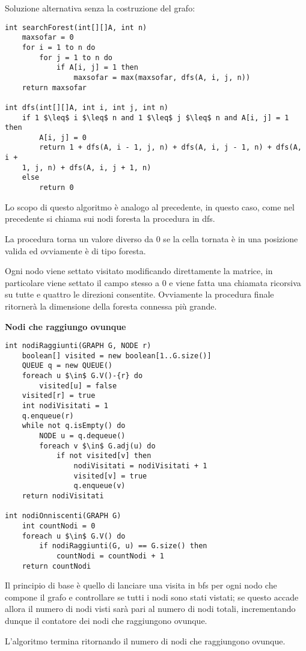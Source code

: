 \documentclass[../cheatSheetAlgoritmi.tex]{subfiles}
\begin{document}
\bigskip

Soluzione alternativa senza la costruzione del grafo:
\begin{lstlisting}[caption=Foresta senza costruzione del grafo]
int searchForest(int[][]A, int n)
	maxsofar = 0
  	for i = 1 to n do
    	for j = 1 to n do
      		if A[i, j] = 1 then
        		maxsofar = max(maxsofar, dfs(A, i, j, n))
  	return maxsofar

int dfs(int[][]A, int i, int j, int n)
	if 1 $\leq$ i $\leq$ n and 1 $\leq$ j $\leq$ n and A[i, j] = 1 then
    	A[i, j] = 0
    	return 1 + dfs(A, i - 1, j, n) + dfs(A, i, j - 1, n) + dfs(A, i +
    1, j, n) + dfs(A, i, j + 1, n)
  	else
    	return 0
\end{lstlisting}
Lo scopo di questo algoritmo è analogo al precedente, in questo caso, come nel precedente si chiama sui nodi foresta la procedura in dfs.

La procedura torna un valore diverso da 0 se la cella tornata è in una posizione valida ed ovviamente è di tipo foresta. 

Ogni nodo viene settato visitato modificando direttamente la matrice, in particolare viene settato il campo stesso a 0 e viene fatta una chiamata ricorsiva su tutte e quattro le direzioni consentite. 
Ovviamente la procedura finale ritornerà la dimensione della foresta connessa più grande.

\bigskip

\textbf{Nodi che raggiungo ovunque}

\begin{lstlisting}[caption=Nodi che raggiungo ovunque]
int nodiRaggiunti(GRAPH G, NODE r)
	boolean[] visited = new boolean[1..G.size()]
  	QUEUE q = new QUEUE()
  	foreach u $\in$ G.V()-{r} do
    	visited[u] = false
  	visited[r] = true
  	int nodiVisitati = 1
  	q.enqueue(r)
  	while not q.isEmpty() do
    	NODE u = q.dequeue()
    	foreach v $\in$ G.adj(u) do
      		if not visited[v] then
        		nodiVisitati = nodiVisitati + 1
        		visited[v] = true
        		q.enqueue(v)
  	return nodiVisitati

int nodiOnniscenti(GRAPH G)
	int countNodi = 0
  	foreach u $\in$ G.V() do
    	if nodiRaggiunti(G, u) == G.size() then
      		countNodi = countNodi + 1
  	return countNodi
\end{lstlisting}
Il principio di base è quello di lanciare una visita in bfs per ogni nodo che compone il grafo e controllare se tutti i nodi sono stati vistati; se questo accade allora il numero di nodi visti sarà pari al numero di nodi totali, incrementando dunque il contatore dei nodi che raggiungono ovunque. 

L'algoritmo termina ritornando il numero di nodi che raggiungono ovunque.
\end{document}
